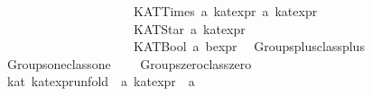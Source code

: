 \begin{isabellebody}
\ \ \ \ \ \ \ \ \ \ \ \ \ \ \ \ \ \ \ \ \ {}\ KATTimes\ {}{}a\ kat{}expr{}\ {}{}a\ kat{}expr{}\isanewline
\ \ \ \ \ \ \ \ \ \ \ \ \ \ \ \ \ \ \ \ \ {}\ KATStar\ {}{}a\ kat{}expr{}\isanewline
\ \ \ \ \ \ \ \ \ \ \ \ \ \ \ \ \ \ \ \ \ {}\ KATBool\ {}{}a\ bexpr{}\isanewline
\isanewline
{}\isamarkupfalse%
\isanewline
\ \ Groups{}plus{}class{}plus\ {}\ {}{}{}\ {}{}{}\ \isanewline
\ \ Groups{}one{}class{}one\ {}{}{}{}{}\ \isanewline
\ \ Groups{}zero{}class{}zero\ {}{}{}{}{}\isanewline
\isanewline
{}\isamarkupfalse%
\ {}\ kat{}\ kat{}expr{}unfold\ {}{}\ {}{}a\ kat{}expr\ {}\ {}a{}\ \isanewline

\end{isabellebody}
